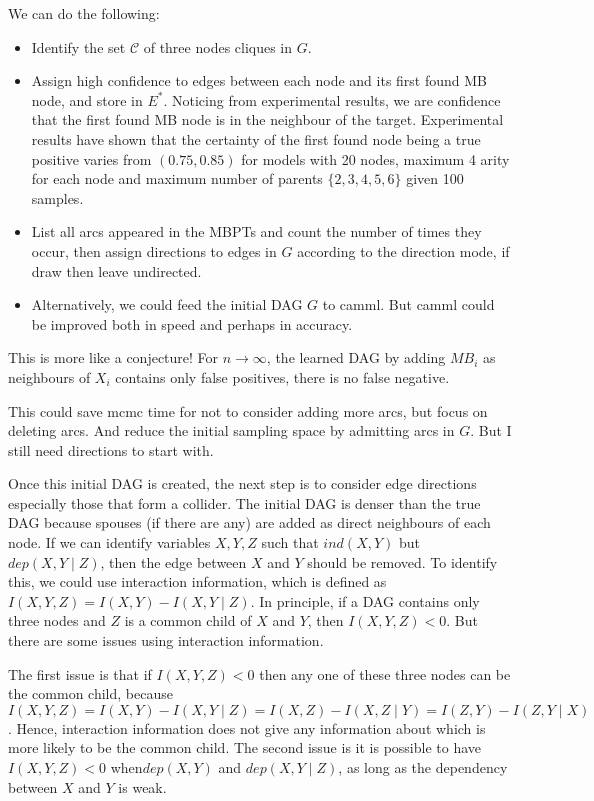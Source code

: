 We can do the following: 
\begin{itemize}
\item Identify the set $\mathcal{C}$ of three nodes cliques in $G$. 
\item Assign high confidence to edges between each node and its first found MB node, and store in $E^*$. Noticing from experimental results, we are confidence that the first found MB node is in the neighbour of the target. Experimental results have shown that the certainty of the first found node being a true positive varies from $(0.75, 0.85)$ for models with 20 nodes, maximum 4 arity for each node and maximum number of parents $\{2,3,4,5,6\}$ given 100 samples. 
\item List all arcs appeared in the MBPTs and count the number of times they occur, then assign directions to edges in $G$ according to the direction mode, if draw then leave undirected. 
\item Alternatively, we could feed the initial DAG $G$ to camml. But camml could be improved both in speed and perhaps in accuracy. 
\end{itemize}
 
\begin{proposition}
This is more like a conjecture! For $n \rightarrow \infty$, the learned DAG by adding $MB_i$ as neighbours of $X_i$ contains only false positives, there is no false negative.  
\end{proposition}
This could save mcmc time for not to consider adding more arcs, but focus on deleting arcs. And reduce the initial sampling space by admitting arcs in $G$. But I still need directions to start with. 

Once this initial DAG is created, the next step is to consider edge directions especially those that form a collider. The initial DAG is denser than the true DAG because spouses (if there are any) are added as direct neighbours of each node. If we can identify variables $X, Y, Z$ such that $ind(X, Y)$ but $dep(X, Y \mid Z)$, then the edge between $X$ and $Y$ should be removed. To identify this, we could use interaction information, which is defined as $I(X, Y, Z) = I(X, Y) - I(X, Y \mid Z)$. In principle, if a DAG contains only three nodes and $Z$ is a common child of $X$ and $Y$, then $I(X, Y, Z) < 0$. But there are some issues using interaction information. 

The first issue is that if $I(X, Y, Z) < 0$ then any one of these three nodes can be the common child, because $I(X, Y, Z) = I(X, Y) - I(X, Y \mid Z) = I(X, Z) - I(X, Z \mid Y) = I(Z, Y) - I(Z, Y \mid X)$. Hence, interaction information does not give any information about which is more likely to be the common child. The second issue is it is possible to have $I(X, Y, Z) < 0$ when$dep(X, Y)$ and $dep(X, Y \mid Z)$, as long as the dependency between $X$ and $Y$ is weak. 

